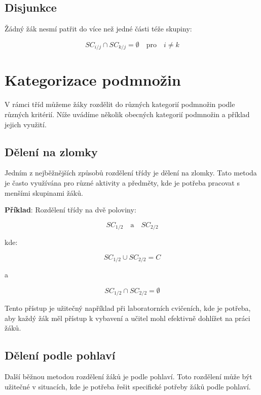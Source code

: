 \subsection*{Disjunkce}

Žádný žák nesmí patřit do více než jedné části téže skupiny:

\[
SC_{i/j} \cap SC_{k/j} = \emptyset \quad \text{pro} \quad i \neq k
\]

\section{Kategorizace podmnožin}

V rámci tříd můžeme žáky rozdělit do různých kategorií podmnožin podle různých kritérií. Níže uvádíme několik obecných kategorií podmnožin a příklad jejich využití.

\subsection*{Dělení na zlomky}

Jedním z nejběžnějších způsobů rozdělení třídy je dělení na zlomky. Tato metoda je často využívána pro různé aktivity a předměty, kde je potřeba pracovat s menšími skupinami žáků.

\setlength{\parindent}{0em}
\setlength{\parskip}{1em}
\textbf{Příklad}: Rozdělení třídy na dvě poloviny:

\[
SC_{1/2} \quad \text{a} \quad SC_{2/2}
\]

kde:

\[
SC_{1/2} \cup SC_{2/2} = C
\]

a

\[
SC_{1/2} \cap SC_{2/2} = \emptyset
\]

Tento přístup je užitečný například při laboratorních cvičeních, kde je potřeba, aby každý žák měl přístup k vybavení a učitel mohl efektivně dohlížet na práci žáků.

\subsection*{Dělení podle pohlaví}

Další běžnou metodou rozdělení žáků je podle pohlaví. Toto rozdělení může být užitečné v situacích, kde je potřeba řešit specifické potřeby žáků podle pohlaví.

